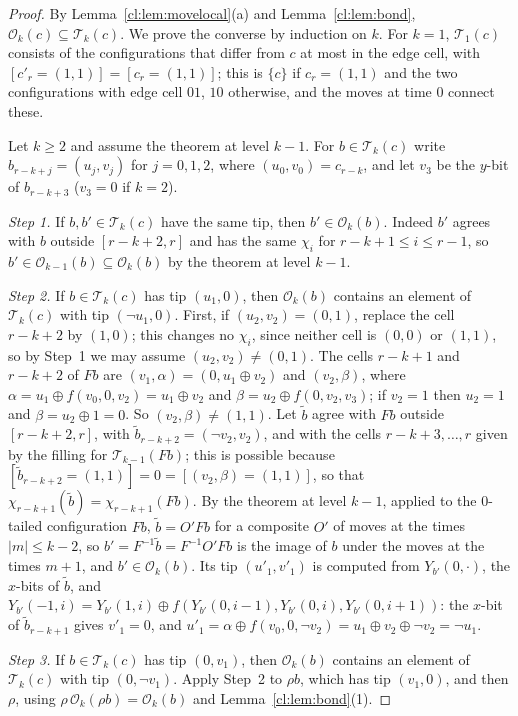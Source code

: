 \begin{proof}
By Lemma~\ref{cl:lem:movelocal}(a) and Lemma~\ref{cl:lem:bond}, $\mathcal O_k(c)\subseteq\mathcal T_k(c)$. We prove the converse by induction on $k$. For $k=1$, $\mathcal T_1(c)$ consists of the configurations that differ from $c$ at most in the edge cell, with $[c'_r=(1,1)]=[c_r=(1,1)]$; this is $\{c\}$ if $c_r=(1,1)$ and the two configurations with edge cell $01$, $10$ otherwise, and the moves at time $0$ connect these.

Let $k\ge2$ and assume the theorem at level $k-1$. For $b\in\mathcal T_k(c)$ write $b_{r-k+j}=(u_j,v_j)$ for $j=0,1,2$, where $(u_0,v_0)=c_{r-k}$, and let $v_3$ be the $y$-bit of $b_{r-k+3}$ ($v_3=0$ if $k=2$).

\emph{Step 1.} If $b,b'\in\mathcal T_k(c)$ have the same tip, then $b'\in\mathcal O_k(b)$. Indeed $b'$ agrees with $b$ outside $[r-k+2,r]$ and has the same $\chi_i$ for $r-k+1\le i\le r-1$, so $b'\in\mathcal O_{k-1}(b)\subseteq\mathcal O_k(b)$ by the theorem at level $k-1$.

\emph{Step 2.} If $b\in\mathcal T_k(c)$ has tip $(u_1,0)$, then $\mathcal O_k(b)$ contains an element of $\mathcal T_k(c)$ with tip $(\neg u_1,0)$. First, if $(u_2,v_2)=(0,1)$, replace the cell $r-k+2$ by $(1,0)$; this changes no $\chi_i$, since neither cell is $(0,0)$ or $(1,1)$, so by Step~1 we may assume $(u_2,v_2)\ne(0,1)$. The cells $r-k+1$ and $r-k+2$ of $Fb$ are $(v_1,\alpha)=(0,u_1\oplus v_2)$ and $(v_2,\beta)$, where $\alpha=u_1\oplus f(v_0,0,v_2)=u_1\oplus v_2$ and $\beta=u_2\oplus f(0,v_2,v_3)$; if $v_2=1$ then $u_2=1$ and $\beta=u_2\oplus1=0$. So $(v_2,\beta)\ne(1,1)$. Let $\tilde b$ agree with $Fb$ outside $[r-k+2,r]$, with $\tilde b_{r-k+2}=(\neg v_2,v_2)$, and with the cells $r-k+3,\dots,r$ given by the filling for $\mathcal T_{k-1}(Fb)$; this is possible because $[\tilde b_{r-k+2}=(1,1)]=0=[(v_2,\beta)=(1,1)]$, so that $\chi_{r-k+1}(\tilde b)=\chi_{r-k+1}(Fb)$. By the theorem at level $k-1$, applied to the $0$-tailed configuration $Fb$, $\tilde b=O'Fb$ for a composite $O'$ of moves at the times $|m|\le k-2$, so $b'=F^{-1}\tilde b=F^{-1}O'Fb$ is the image of $b$ under the moves at the times $m+1$, and $b'\in\mathcal O_k(b)$. Its tip $(u'_1,v'_1)$ is computed from $Y_{b'}(0,\cdot)$, the $x$-bits of $\tilde b$, and $Y_{b'}(-1,i)=Y_{b'}(1,i)\oplus f(Y_{b'}(0,i-1),Y_{b'}(0,i),Y_{b'}(0,i+1))$: the $x$-bit of $\tilde b_{r-k+1}$ gives $v'_1=0$, and $u'_1=\alpha\oplus f(v_0,0,\neg v_2)=u_1\oplus v_2\oplus\neg v_2=\neg u_1$.

\emph{Step 3.} If $b\in\mathcal T_k(c)$ has tip $(0,v_1)$, then $\mathcal O_k(b)$ contains an element of $\mathcal T_k(c)$ with tip $(0,\neg v_1)$. Apply Step~2 to $\rho b$, which has tip $(v_1,0)$, and then $\rho$, using $\rho\,\mathcal O_k(\rho b)=\mathcal O_k(b)$ and Lemma~\ref{cl:lem:bond}(1).


\end{proof}
